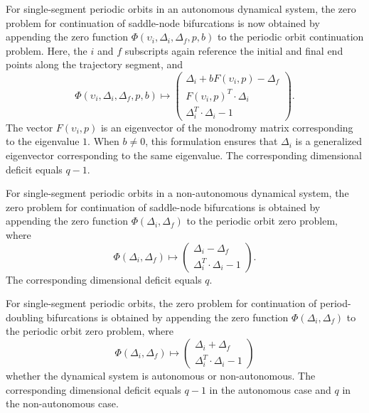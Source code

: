 For single-segment periodic orbits in an autonomous dynamical system, the zero problem for continuation of saddle-node bifurcations is now obtained by appending the zero function $\Phi(\upsilon_i,\Delta_i,\Delta_f,p,b)$ to the periodic orbit continuation problem. Here, the $i$ and $f$ subscripts again reference the initial and final end points along the trajectory segment, and
\begin{equation}
\Phi(\upsilon_i,\Delta_i,\Delta_f,p,b)\mapsto\left(\begin{array}{c}\Delta_i+bF(\upsilon_i,p)-\Delta_f\\F(\upsilon_i,p)^T\cdot\Delta_i\\\Delta_i^T\cdot\Delta_i-1\end{array}\right).
\end{equation}
The vector $F(\upsilon_i,p)$ is an eigenvector of the monodromy matrix corresponding to the eigenvalue $1$. When $b\ne 0$, this formulation ensures that $\Delta_i$ is a generalized eigenvector corresponding to the same eigenvalue. The corresponding dimensional deficit equals $q-1$.

For single-segment periodic orbits in a non-autonomous dynamical system, the zero problem for continuation of saddle-node bifurcations is obtained by appending the zero function $\Phi(\Delta_i,\Delta_f)$ to the periodic orbit zero problem, where
\begin{equation}
\Phi(\Delta_i,\Delta_f)\mapsto\left(\begin{array}{c}\Delta_i-\Delta_f\\\Delta_i^T\cdot\Delta_i-1\end{array}\right).
\end{equation}
The corresponding dimensional deficit equals $q$.

For single-segment periodic orbits, the zero problem for continuation of period-doubling bifurcations is obtained by appending the zero function $\Phi(\Delta_i,\Delta_f)$ to the periodic orbit zero problem, where
\begin{equation}
\Phi(\Delta_i,\Delta_f)\mapsto\left(\begin{array}{c}\Delta_i+\Delta_f\\\Delta_i^T\cdot\Delta_i-1\end{array}\right)
\end{equation}
whether the dynamical system is autonomous or non-autonomous. The corresponding dimensional deficit equals $q-1$ in the autonomous case and $q$ in the non-autonomous case.

